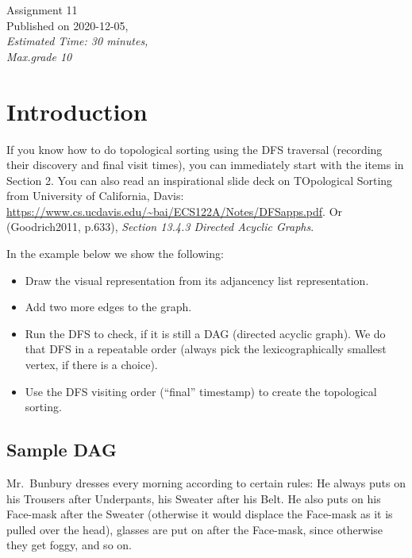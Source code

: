 \documentclass[a4paper,12pt]{article}
\begin{document}
\twocolumn

\thispagestyle{empty}

\begin{center}
{\Large Assignment 11}\\
{\Large Published on 2020-12-05,}\\
{\em Estimated Time: 30 minutes,}\\
{\em Max.grade 10\textperthousand} 
\end{center}


\section{Introduction}

If you know how to do topological sorting using 
the DFS traversal (recording their 
discovery and final visit times), you can immediately 
start with the items in Section 2.
You can also read an inspirational slide deck on TOpological Sorting 
from University of California, Davis:\\
\url{https://www.cs.ucdavis.edu/~bai/ECS122A/Notes/DFSapps.pdf}. 
Or (Goodrich2011, p.633), 
{\em Section 13.4.3 Directed Acyclic Graphs}.


In the example below we show the following: 
\begin{itemize}
\item Draw the visual representation from its adjancency list
representation.
\item Add two more edges to the graph. 
\item Run the DFS to check, if it is still a DAG (directed acyclic graph). 
We do that DFS in a repeatable order (always pick the lexicographically smallest
vertex, if there is a choice). 
\item Use the DFS visiting order (``final'' timestamp) to 
create the topological sorting.
\end{itemize}


\subsection{Sample DAG}

Mr.\ Bunbury dresses every morning according to
certain rules: He always puts on his Trousers
after Underpants, his Sweater after his Belt. 
He also puts on his Face-mask after the Sweater 
(otherwise it would displace the Face-mask 
as it is pulled over the head), 
glasses are put on after the Face-mask, 
since otherwise they get foggy, and so on.
\end{document}
